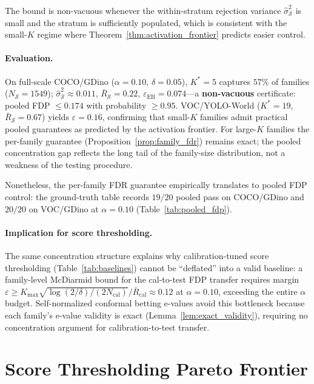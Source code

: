 \documentclass{article}
\theoremstyle{remark}
\newcommand{\1}{\mathbf{1}}
\begin{document}
The bound is non-vacuous whenever the within-stratum rejection
variance $\hat\sigma_{\mathcal{S}}^2$ is small and the stratum is
sufficiently populated, which is consistent with the small-$K$
regime where Theorem~\ref{thm:activation_frontier} predicts easier
control.

\paragraph{Evaluation.}
On full-scale COCO/GDino ($\alpha\!=\!0.10$, $\delta\!=\!0.05$),
$K^*\!=\!5$ captures $57\%$ of families ($N_{\mathcal{S}}\!=\!1549$);
$\hat\sigma_{\mathcal{S}}^2\!\approx\!0.011$, $\bar R_{\mathcal{S}}\!=\!0.22$,
$\varepsilon_{\mathrm{EB}}\!=\!0.074$---a \textbf{non-vacuous}
certificate: pooled FDP $\le 0.174$ with probability $\ge 0.95$.
VOC/YOLO-World ($K^*\!=\!19$, $\bar R_{\mathcal{S}}\!=\!0.67$) yields
$\varepsilon\!=\!0.16$, confirming that small-$K$ families admit
practical pooled guarantees as predicted by the activation frontier.
For large-$K$ families the per-family guarantee
(Proposition~\ref{prop:family_fdr}) remains exact; the pooled
concentration gap reflects the long tail of the family-size
distribution, not a weakness of the testing procedure.

Nonetheless, the per-family FDR guarantee empirically translates to
pooled FDP control: the ground-truth table records $19/20$ pooled
pass on COCO/GDino and $20/20$ on VOC/GDino at $\alpha=0.10$
(Table~\ref{tab:pooled_fdp}).

\paragraph{Implication for score thresholding.}
The same concentration structure explains why calibration-tuned score
thresholding (Table~\ref{tab:baselines}) cannot be ``deflated'' into a
valid baseline: a family-level McDiarmid bound for the cal-to-test FDP
transfer requires margin
$\varepsilon \ge K_{\max}\sqrt{\log(2/\delta)/(2 N_{\mathrm{cal}})} /
\bar{R}_{\mathrm{cal}} \approx 0.12$ at $\alpha\!=\!0.10$, exceeding
the entire $\alpha$ budget. Self-normalized conformal betting e-values
avoid this bottleneck because each family's e-value validity is exact
(Lemma~\ref{lem:exact_validity}), requiring no concentration argument
for calibration-to-test transfer.

\section{Score Thresholding Pareto Frontier}
\label{app:pareto}
\end{document}
